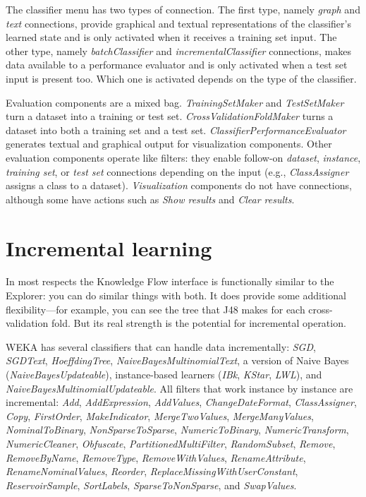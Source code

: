 The classifier menu has two types of connection. The first type,
namely \textit{graph} and \textit{text} connections, provide graphical
and textual representations of the classifier's learned state and is
only activated when it receives a training set input. The other type,
namely \textit{batchClassifier} and \textit{incrementalClassifier}
connections, makes data available to a performance evaluator and is
only activated when a test set input is present too. Which one is
activated depends on the type of the classifier.

Evaluation components are a mixed bag. \textit{TrainingSetMaker} and
\textit{TestSetMaker} turn a dataset into a training or test
set. \textit{CrossValidationFoldMaker} turns a dataset into both a
training set and a test set. \textit{ClassifierPerformanceEvaluator}
generates textual and graphical output for visualization
components. Other evaluation components operate like filters: they
enable follow-on \textit{dataset}, \textit{instance}, \textit{training
set}, or \textit{test set} connections depending on the input (e.g.,
\textit{ClassAssigner} assigns a class to a dataset). \textit{Visualization} components
do not have connections, although some have actions such
as \textit{Show results} and \textit{Clear results}.

\section{Incremental learning}

In most respects the Knowledge Flow interface is functionally similar
to the Explorer: you can do similar things with both. It does provide
some additional flexibility---for example, you can see the tree that J48
makes for each cross-validation fold. But its real strength is the
potential for incremental operation.

WEKA has several classifiers that can handle data incrementally: \textit{SGD},
\textit{SGDText}, \textit{HoeffdingTree}, \textit{NaiveBayesMultinomialText}, a version of Naive
Bayes (\textit{NaiveBayesUpdateable}), instance-based learners (\textit{IBk}, \textit{KStar},
\textit{LWL}), and \textit{NaiveBayesMultinomialUpdateable}. All filters that work
instance by instance are
incremental: \textit{Add}, \textit{AddExpression}, \textit{AddValues},
\textit{ChangeDateFormat}, \textit{ClassAssigner}, \textit{Copy}, \textit{FirstOrder}, \textit{MakeIndicator},
\textit{MergeTwoValues}, \textit{MergeManyValues}, \textit{NominalToBinary}, \textit{NonSparseToSparse},
\textit{NumericToBinary}, \textit{NumericTransform}, \textit{NumericCleaner}, \textit{Obfuscate},
\textit{PartitionedMultiFilter}, \textit{RandomSubset}, \textit{Remove}, \textit{RemoveByName},
\textit{RemoveType}, \textit{RemoveWithValues}, \textit{RenameAttribute}, \textit{RenameNominalValues},
\textit{Reorder}, \textit{ReplaceMissingWithUserConstant}, \textit{ReservoirSample}, \textit{SortLabels},
\textit{SparseToNonSparse}, and \textit{SwapValues}.


